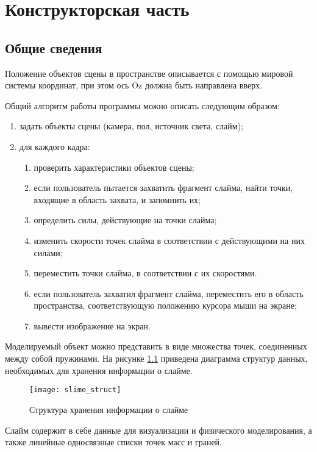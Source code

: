 \chapter{Конструкторская часть}

\section{Общие сведения}

Положение объектов сцены в пространстве описывается с помощью
мировой системы координат, при этом ось Oz должна быть направлена вверх.

Общий алгоритм работы программы можно описать следующим образом:

\begin{enumerate}
	\item задать объекты сцены (камера, пол, источник света, слайм);
	\item для каждого кадра:
	\begin{enumerate}
		\item проверить характеристики объектов сцены;
		\item если пользователь пытается захватить фрагмент слайма, найти точки, входящие в область захвата, и запомнить их;
		\item определить силы, действующие на точки слайма;
		\item изменить скорости точек слайма в соответствии с действующими на них силами;
		\item переместить точки слайма, в соответствии с их скоростями.
		\item если пользователь захватил фрагмент слайма, переместить его в область пространства, соответствующую положению курсора мыши на экране;
		\item вывести изображение на экран.
	\end{enumerate}
\end{enumerate}

Моделируемый объект можно представить в виде множества точек, соединенных между собой пружинами. На рисунке \ref{slime_struct} приведена диаграмма структур данных, необходимых для хранения информации о слайме.

\begin{figure}[H]
	\centering
	\texttt{[image: slime\_struct]}
	\caption{Структура хранения информации о слайме}
	\label{slime_struct}
\end{figure}

Слайм содержит в себе данные для визуализации и физического моделирования, а также линейные односвязные списки точек масс и граней.

